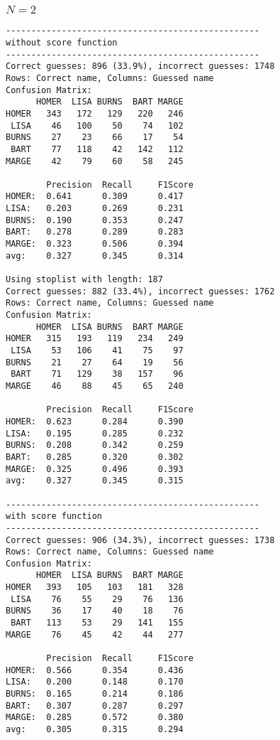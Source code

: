 \documentclass[a5paper]{article}
\begin{document}
\subsubsection{$N=2$}
\begin{verbatim}
--------------------------------------------------
without score function
--------------------------------------------------
Correct guesses: 896 (33.9%), incorrect guesses: 1748
Rows: Correct name, Columns: Guessed name
Confusion Matrix:
      HOMER  LISA BURNS  BART MARGE 
HOMER   343   172   129   220   246 
 LISA    46   100    50    74   102 
BURNS    27    23    66    17    54 
 BART    77   118    42   142   112 
MARGE    42    79    60    58   245 

        Precision  Recall     F1Score    
HOMER:  0.641      0.309      0.417      
LISA:   0.203      0.269      0.231      
BURNS:  0.190      0.353      0.247      
BART:   0.278      0.289      0.283      
MARGE:  0.323      0.506      0.394      
avg:    0.327      0.345      0.314      

Using stoplist with length: 187
Correct guesses: 882 (33.4%), incorrect guesses: 1762
Rows: Correct name, Columns: Guessed name
Confusion Matrix:
      HOMER  LISA BURNS  BART MARGE 
HOMER   315   193   119   234   249 
 LISA    53   106    41    75    97 
BURNS    21    27    64    19    56 
 BART    71   129    38   157    96 
MARGE    46    88    45    65   240 

        Precision  Recall     F1Score    
HOMER:  0.623      0.284      0.390      
LISA:   0.195      0.285      0.232      
BURNS:  0.208      0.342      0.259      
BART:   0.285      0.320      0.302      
MARGE:  0.325      0.496      0.393      
avg:    0.327      0.345      0.315      

--------------------------------------------------
with score function
--------------------------------------------------
Correct guesses: 906 (34.3%), incorrect guesses: 1738
Rows: Correct name, Columns: Guessed name
Confusion Matrix:
      HOMER  LISA BURNS  BART MARGE 
HOMER   393   105   103   181   328 
 LISA    76    55    29    76   136 
BURNS    36    17    40    18    76 
 BART   113    53    29   141   155 
MARGE    76    45    42    44   277 

        Precision  Recall     F1Score    
HOMER:  0.566      0.354      0.436      
LISA:   0.200      0.148      0.170      
BURNS:  0.165      0.214      0.186      
BART:   0.307      0.287      0.297      
MARGE:  0.285      0.572      0.380      
avg:    0.305      0.315      0.294      


\end{verbatim}
\end{document}
